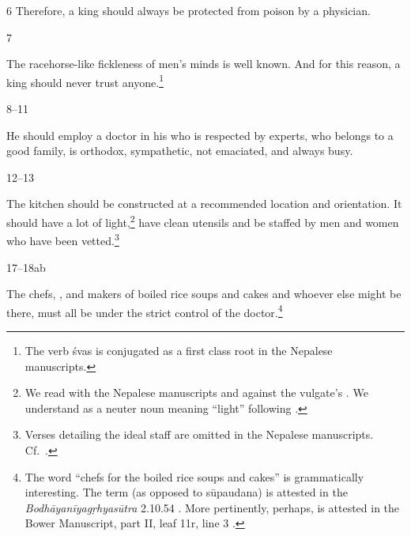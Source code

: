 \begin{translation}
\item[6] Therefore, a king should always be protected from poison by a physician.


\item [7] 

The racehorse-like fickleness of men's minds is well known. And for this reason, a
king should never trust anyone.\footnote{The verb \root śvas is conjugated as a
first class root in the Nepalese manuscripts.}

\item [8--11]

He should employ a doctor in his  who is respected by experts, who 
belongs to a good family, is orthodox, sympathetic, not emaciated, and always busy.

\item [12--13]

The kitchen should be constructed at a recommended location and orientation.  It should
have a lot of light,\footnote{We read  with the Nepalese manuscripts and 
against the vulgate's .  We understand  as a neuter noun 
meaning “light” following \citet[1050a]{apte-prac}.} have clean utensils and be staffed by 
men 
and
women who have been vetted.\footnote{Verses detailing the ideal staff are omitted in the 
Nepalese manuscripts. 
Cf.\ \cites[560]{vulgate}[132]{wuja-2003}.}


\item[17--18ab]

The chefs, , and makers of boiled rice soups and cakes and whoever
else might be there, must all be under the strict control of the
doctor.\footnote{The word  “chefs for the boiled rice soups
and cakes” is grammatically interesting.  The term  (as opposed to
sūpaudana) is attested in the \emph{Bodhāyanīya\-gṛhyasūtra} 2.10.54 
\citep[68]{shas-1920}.  More pertinently, perhaps,  is attested in
the Bower Manuscript, part II, leaf 11r, line 3 \citep[vol.\,1,
p.\,43]{hoer-bowe}.} 


\end{translation}
